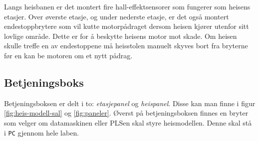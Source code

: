 \begin{alphasection}
Langs heisbanen er det montert fire hall-effektsensorer som fungerer som heisens etasjer. Over øverste etasje, og under nederste etasje, er det også montert endestoppbrytere som vil kutte motorpådraget dersom heisen kjører utenfor sitt lovlige område. Dette er for å beskytte heisens motor mot skade. Om heisen skulle treffe en av endestoppene må heisstolen manuelt skyves bort fra bryterne før en kan be motoren om et nytt pådrag.

\subsection{Betjeningsboks}
Betjeningsboksen er delt i to: \textit{etasjepanel} og \textit{heispanel}. Disse kan man finne i figur \ref{fig:heis-modell-sal} og \ref{fig:paneler}. Øverst på betjeningsboksen finnes en bryter som velger om datamaskinen eller PLSen skal styre heismodellen. Denne skal stå i \verb|PC| gjennom hele laben.

\begin{figure}[ht]
    \centering
    




\begin{tikzpicture}[x=0.75pt,y=0.75pt,yscale=-1,xscale=1]


\end{tikzpicture}
\end{figure}
\end{alphasection}
